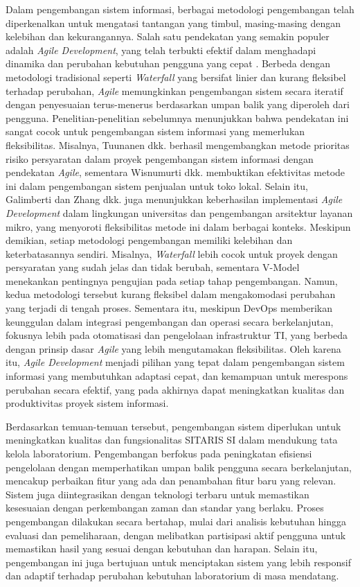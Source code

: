 Dalam pengembangan sistem informasi, berbagai metodologi pengembangan telah diperkenalkan untuk mengatasi tantangan yang timbul, masing-masing dengan kelebihan dan kekurangannya. Salah satu pendekatan yang semakin populer adalah \textit{Agile Development}, yang telah terbukti efektif dalam menghadapi dinamika dan perubahan kebutuhan pengguna yang cepat \cite{al2020agile}. Berbeda dengan metodologi tradisional seperti \textit{Waterfall} yang bersifat linier dan kurang fleksibel terhadap perubahan, \textit{Agile} memungkinkan pengembangan sistem secara iteratif dengan penyesuaian terus-menerus berdasarkan umpan balik yang diperoleh dari pengguna. Penelitian-penelitian sebelumnya menunjukkan bahwa pendekatan ini sangat cocok untuk pengembangan sistem informasi yang memerlukan fleksibilitas. Misalnya, Tuunanen dkk. \citeyear{tuunanen2023development} berhasil mengembangkan metode prioritas risiko persyaratan dalam proyek pengembangan sistem informasi dengan pendekatan \textit{Agile}, sementara Wisnumurti dkk. \citeyear{wisnumurti2022penerapan} membuktikan efektivitas metode ini dalam pengembangan sistem penjualan untuk toko lokal. Selain itu, Galimberti \citeyear{trelles2021agile} dan Zhang dkk. \citeyear{zhang2024establishment} juga menunjukkan keberhasilan implementasi \textit{Agile Development} dalam lingkungan universitas dan pengembangan arsitektur layanan mikro, yang menyoroti fleksibilitas metode ini dalam berbagai konteks. Meskipun demikian, setiap metodologi pengembangan memiliki kelebihan dan keterbatasannya sendiri. Misalnya, \textit{Waterfall} lebih cocok untuk proyek dengan persyaratan yang sudah jelas dan tidak berubah, sementara V-Model menekankan pentingnya pengujian pada setiap tahap pengembangan. Namun, kedua metodologi tersebut kurang fleksibel dalam mengakomodasi perubahan yang terjadi di tengah proses. Sementara itu, meskipun DevOps memberikan keunggulan dalam integrasi pengembangan dan operasi secara berkelanjutan, fokusnya lebih pada otomatisasi dan pengelolaan infrastruktur TI, yang berbeda dengan prinsip dasar \textit{Agile} yang lebih mengutamakan fleksibilitas. Oleh karena itu, \textit{Agile Development} menjadi pilihan yang tepat dalam pengembangan sistem informasi yang membutuhkan adaptasi cepat, dan kemampuan untuk merespons perubahan secara efektif, yang pada akhirnya dapat meningkatkan kualitas dan produktivitas proyek sistem informasi.

Berdasarkan temuan-temuan tersebut, pengembangan sistem diperlukan untuk meningkatkan kualitas dan fungsionalitas SITARIS SI dalam mendukung tata kelola laboratorium. Pengembangan berfokus pada peningkatan efisiensi pengelolaan dengan memperhatikan umpan balik pengguna secara berkelanjutan, mencakup perbaikan fitur yang ada dan penambahan fitur baru yang relevan. Sistem juga diintegrasikan dengan teknologi terbaru untuk memastikan kesesuaian dengan perkembangan zaman dan standar yang berlaku. Proses pengembangan dilakukan secara bertahap, mulai dari analisis kebutuhan hingga evaluasi dan pemeliharaan, dengan melibatkan partisipasi aktif pengguna untuk memastikan hasil yang sesuai dengan kebutuhan dan harapan. Selain itu, pengembangan ini juga bertujuan untuk menciptakan sistem yang lebih responsif dan adaptif terhadap perubahan kebutuhan laboratorium di masa mendatang.

